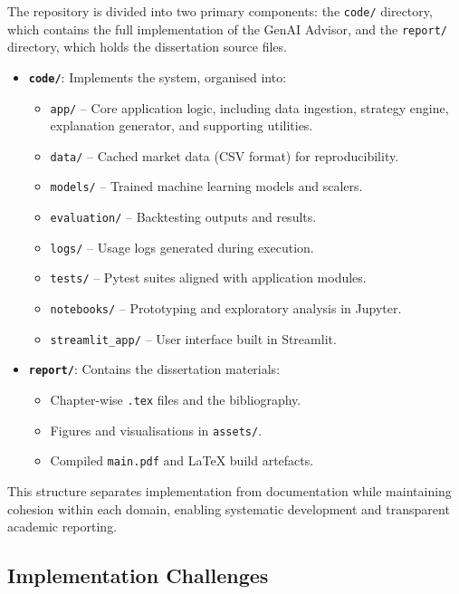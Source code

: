The repository is divided into two primary components: the \texttt{code/} directory, which contains the full implementation of the GenAI Advisor, and the \texttt{report/} directory, which holds the dissertation source files.

\begin{itemize}
    \item \textbf{\texttt{code/}}: Implements the system, organised into:
    \begin{itemize}
        \item \texttt{app/} – Core application logic, including data ingestion, strategy engine, explanation generator, and supporting utilities.
        \item \texttt{data/} – Cached market data (CSV format) for reproducibility.
        \item \texttt{models/} – Trained machine learning models and scalers.
        \item \texttt{evaluation/} – Backtesting outputs and results.
        \item \texttt{logs/} – Usage logs generated during execution.
        \item \texttt{tests/} – Pytest suites aligned with application modules.
        \item \texttt{notebooks/} – Prototyping and exploratory analysis in Jupyter.
        \item \texttt{streamlit\_app/} – User interface built in Streamlit.
    \end{itemize}
    \item \textbf{\texttt{report/}}: Contains the dissertation materials:
    \begin{itemize}
        \item Chapter-wise \texttt{.tex} files and the bibliography.
        \item Figures and visualisations in \texttt{assets/}.
        \item Compiled \texttt{main.pdf} and LaTeX build artefacts.
    \end{itemize}
\end{itemize}

This structure separates implementation from documentation while maintaining cohesion within each domain, enabling systematic development and transparent academic reporting.

\subsection{Implementation Challenges}

